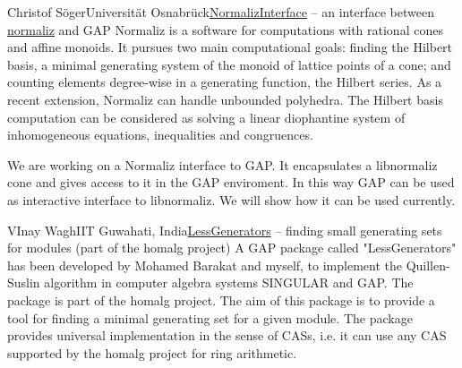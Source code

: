 \documentclass[12pt,a4paper]{article}
\begin{document}
\begin{Abstract}{Christof Söger}{Universität Osnabrück}{\href{https://github.com/fingolfin/NormalizInterface}{NormalizInterface} -- an interface between \href{http://www.math.uos.de/normaliz}{normaliz} and GAP}
Normaliz is a software for computations with rational cones and affine
monoids. It pursues two main computational goals: finding the Hilbert
basis, a minimal generating system of the monoid of lattice points of a
cone; and counting elements degree-wise in a generating function, the
Hilbert series. As a recent extension, Normaliz can handle unbounded
polyhedra. The Hilbert basis computation can be considered as solving a
linear diophantine system of inhomogeneous equations, inequalities and
congruences.

We are working on a Normaliz interface to GAP. It encapsulates a
libnormaliz cone and gives access to it in the GAP enviroment. In this
way GAP can be used as interactive interface to libnormaliz. We will
show how it can be used currently.
\end{Abstract}


\begin{Abstract}{VInay Wagh}{IIT Guwahati, India}{\href{https://github.com/homalg-project/LessGenerators}{LessGenerators} -- finding small generating sets for modules (part of the homalg project)}
A GAP package called "LessGenerators" has been developed by Mohamed
Barakat and myself, to implement the Quillen-Suslin algorithm in
computer algebra systems SINGULAR and GAP. The package is part of the
homalg project. The aim of this package is to provide a tool for finding
a minimal generating set for a given module. The package provides
universal implementation in the sense of CASs, i.e. it can use any CAS
supported by the homalg project for ring arithmetic.
\end{Abstract}
\end{document}
